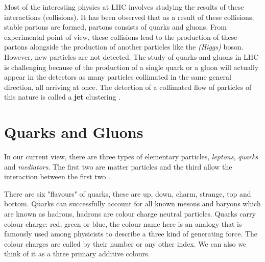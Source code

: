 Most of the interesting physics at LHC involves studying the results of these interactions (collisions). It has been observed that as a result of these collisions, stable partons are formed, partons consists of quarks and gluons. From experimental point of view, these collisions lead to the production of these partons alongside the production of another particles like the \emph{(Higgs)} boson. However, new particles are not detected.
The study of quarks and gluons in LHC is challenging because of the production of a single quark or a gluon will actually appear in the detectors as many particles collimated in the same general direction, all arriving at once. The detection of a collimated flow of particles of this nature is called a \textbf{jet} clustering\label{Lhc} \citep{Ellis:2007ib}.   



\section{Quarks and Gluons}
In our current view, there are three types of elementary particles, \emph{leptons}, \emph{quarks} and \emph{mediators}. The first two are matter particles and the third allow the interaction between the first two \citep{griffiths2008introduction}.

There are six "flavours" of quarks, these are up, down, charm, strange, top and bottom.
Quarks can successfully account for all known mesons and baryons which are known as hadrons, hadrons are colour charge neutral particles. 
%
%
Quarks carry colour charge: red, green or blue, the colour name here is an analogy  that is famously used among physicists to describe a three kind of generating force. The colour charges are called by their number or any other index. We can also we think of it as a three primary additive colours. 


